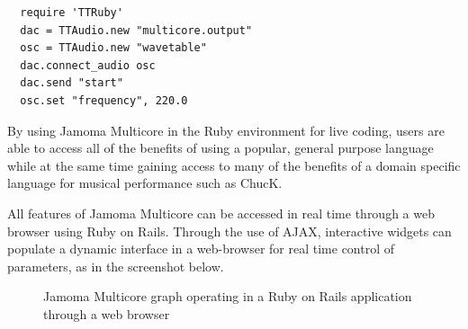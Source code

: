 \documentclass[twoside,a4paper]{article}
\begin{document}
\begin{lstlisting}
  require 'TTRuby'
  dac = TTAudio.new "multicore.output"
  osc = TTAudio.new "wavetable"
  dac.connect_audio osc
  dac.send "start"
  osc.set "frequency", 220.0
\end{lstlisting}

\noindent By using Jamoma Multicore in the Ruby environment for live coding, users are able to access all of the benefits of using a popular, general purpose language while at the same time gaining access to many of the benefits of a domain specific language for musical performance such as ChucK.


All features of Jamoma Multicore can be accessed in real time through a web browser using Ruby on Rails.  Through the use of AJAX, interactive widgets can populate a dynamic interface in a web-browser for real time control of parameters, as in the screenshot below.

\begin{figure}[htbp]
\centerline{}
\caption{Jamoma Multicore graph operating in a Ruby on Rails application through a web browser}
\label{fig:rails}
\end{figure}
\end{document}
